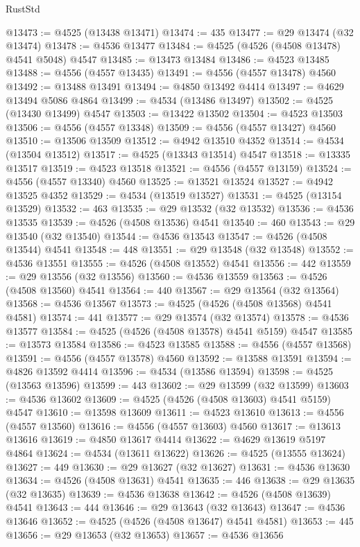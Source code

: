 \begin{lexlean}{RustStd}
\begin{coremodule}
@13473 := @4525 (@13438 @13471)
@13474 := 435
@13477 := @29 @13474 (@32 @13474)
@13478 := @4536 @13477
@13484 := @4525 (@4526 (@4508 @13478) @4541 @5048) @4547
@13485 := @13473 @13484
@13486 := @4523 @13485
@13488 := @4556 (@4557 @13435)
@13491 := @4556 (@4557 @13478) @4560
@13492 := @13488 @13491
@13494 := @4850 @13492 @4414
@13497 := @4629 @13494 @5086 @4864
@13499 := @4534 (@13486 @13497)
@13502 := @4525 (@13430 @13499) @4547
@13503 := @13422 @13502
@13504 := @4523 @13503
@13506 := @4556 (@4557 @13348)
@13509 := @4556 (@4557 @13427) @4560
@13510 := @13506 @13509
@13512 := @4942 @13510 @4352
@13514 := @4534 (@13504 @13512)
@13517 := @4525 (@13343 @13514) @4547
@13518 := @13335 @13517
@13519 := @4523 @13518
@13521 := @4556 (@4557 @13159)
@13524 := @4556 (@4557 @13340) @4560
@13525 := @13521 @13524
@13527 := @4942 @13525 @4352
@13529 := @4534 (@13519 @13527)
@13531 := @4525 (@13154 @13529)
@13532 := 463
@13535 := @29 @13532 (@32 @13532)
@13536 := @4536 @13535
@13539 := @4526 (@4508 @13536) @4541
@13540 := 460
@13543 := @29 @13540 (@32 @13540)
@13544 := @4536 @13543
@13547 := @4526 (@4508 @13544) @4541
@13548 := 448
@13551 := @29 @13548 (@32 @13548)
@13552 := @4536 @13551
@13555 := @4526 (@4508 @13552) @4541
@13556 := 442
@13559 := @29 @13556 (@32 @13556)
@13560 := @4536 @13559
@13563 := @4526 (@4508 @13560) @4541
@13564 := 440
@13567 := @29 @13564 (@32 @13564)
@13568 := @4536 @13567
@13573 := @4525 (@4526 (@4508 @13568) @4541 @4581)
@13574 := 441
@13577 := @29 @13574 (@32 @13574)
@13578 := @4536 @13577
@13584 := @4525 (@4526 (@4508 @13578) @4541 @5159) @4547
@13585 := @13573 @13584
@13586 := @4523 @13585
@13588 := @4556 (@4557 @13568)
@13591 := @4556 (@4557 @13578) @4560
@13592 := @13588 @13591
@13594 := @4826 @13592 @4414
@13596 := @4534 (@13586 @13594)
@13598 := @4525 (@13563 @13596)
@13599 := 443
@13602 := @29 @13599 (@32 @13599)
@13603 := @4536 @13602
@13609 := @4525 (@4526 (@4508 @13603) @4541 @5159) @4547
@13610 := @13598 @13609
@13611 := @4523 @13610
@13613 := @4556 (@4557 @13560)
@13616 := @4556 (@4557 @13603) @4560
@13617 := @13613 @13616
@13619 := @4850 @13617 @4414
@13622 := @4629 @13619 @5197 @4864
@13624 := @4534 (@13611 @13622)
@13626 := @4525 (@13555 @13624)
@13627 := 449
@13630 := @29 @13627 (@32 @13627)
@13631 := @4536 @13630
@13634 := @4526 (@4508 @13631) @4541
@13635 := 446
@13638 := @29 @13635 (@32 @13635)
@13639 := @4536 @13638
@13642 := @4526 (@4508 @13639) @4541
@13643 := 444
@13646 := @29 @13643 (@32 @13643)
@13647 := @4536 @13646
@13652 := @4525 (@4526 (@4508 @13647) @4541 @4581)
@13653 := 445
@13656 := @29 @13653 (@32 @13653)
@13657 := @4536 @13656

\end{coremodule}
\end{lexlean}
